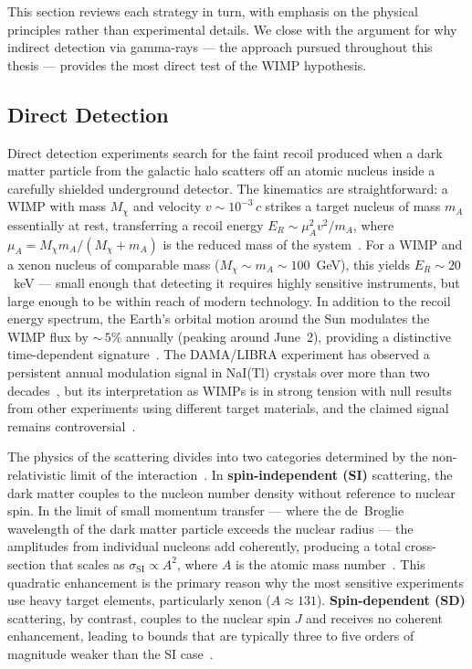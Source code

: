 This section reviews each strategy in turn, with emphasis on the physical principles rather than experimental details.
We close with the argument for why indirect detection via gamma-rays --- the approach pursued throughout this thesis --- provides the most direct test of the WIMP hypothesis.

\subsection{Direct Detection}
\label{sec:1.3.1}

Direct detection experiments search for the faint recoil produced when a dark matter particle from the galactic halo scatters off an atomic nucleus inside a carefully shielded underground detector.
The kinematics are straightforward: a WIMP with mass $M_\chi$ and velocity $v \sim 10^{-3}\,c$ strikes a target nucleus of mass $m_A$ essentially at rest, transferring a recoil energy $E_R \sim \mu_A^2 v^2 / m_A$, where $\mu_A = M_\chi m_A / (M_\chi + m_A)$ is the reduced mass of the system~\cite{Dodelson:2020bqr}.
For a WIMP and a xenon nucleus of comparable mass ($M_\chi \sim m_A \sim 100$~GeV), this yields $E_R \sim 20$~keV --- small enough that detecting it requires highly sensitive instruments, but large enough to be within reach of modern technology.
In addition to the recoil energy spectrum, the Earth's orbital motion around the Sun modulates the WIMP flux by ${\sim}\,5\%$ annually (peaking around June~2), providing a distinctive time-dependent signature~\cite{Drukier:1986tm}.
The DAMA/LIBRA experiment has observed a persistent annual modulation signal in NaI(Tl) crystals over more than two decades~\cite{Bernabei:2018yyw}, but its interpretation as WIMPs is in strong tension with null results from other experiments using different target materials, and the claimed signal remains controversial~\cite{ANAIS-112:2025fne}.

The physics of the scattering divides into two categories determined by the non-relativistic limit of the interaction~\cite{Cirelli:2024ssz,Hooper:2024}.
In \textbf{spin-independent (SI)} scattering, the dark matter couples to the nucleon number density without reference to nuclear spin.
In the limit of small momentum transfer --- where the de~Broglie wavelength of the dark matter particle exceeds the nuclear radius --- the amplitudes from individual nucleons add coherently, producing a total cross-section that scales as $\sigma_\text{SI} \propto A^2$, where $A$ is the atomic mass number~\cite{Cirelli:2024ssz,Hooper:2024}.
This quadratic enhancement is the primary reason why the most sensitive experiments use heavy target elements, particularly xenon ($A \approx 131$).
\textbf{Spin-dependent (SD)} scattering, by contrast, couples to the nuclear spin $J$ and receives no coherent enhancement, leading to bounds that are typically three to five orders of magnitude weaker than the SI case~\cite{Cirelli:2024ssz}.


